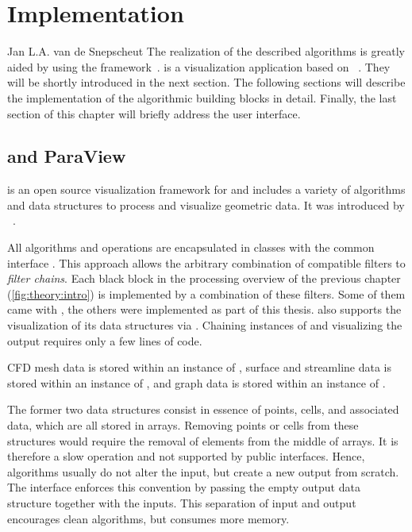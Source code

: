 

\chapter{Implementation}
\label{chp:impl}

{Jan L.A. van de Snepscheut}
%
The realization of the described algorithms is greatly aided by using the \vtk framework~\cite{VTK}. \paraview is a visualization application based on \vtk~\cite{ParaView}. They will be shortly introduced in the next section. The following sections will describe the implementation of the algorithmic building blocks in detail. Finally, the last section of this chapter will briefly address the user interface.


\section[VTK and ParaView]{ and ParaView}

\emph{\vtk}is an open source visualization framework for \Cpp and includes a variety of algorithms and data structures to process and visualize geometric data. It was introduced by ~\cite{VTKPaper}.

All \vtk algorithms and operations are encapsulated in classes with the common interface . This approach allows the arbitrary combination of compatible filters to \emph{filter chains}. Each black block in the processing overview of the previous chapter (\autoref{fig:theory:intro}) is implemented by a combination of these filters. Some of them came with \vtk, the others were implemented as part of this thesis.
\vtk also supports the visualization of its data structures via .
Chaining instances of  and visualizing the output requires only a few lines of code.

\threed \ac{CFD} mesh data is stored within an instance of , surface and streamline data is stored within an instance of , and graph data is stored within an instance of .

The former two data structures consist in essence of points, cells, and associated data, which are all stored in arrays. Removing points or cells from these structures would require the removal of elements from the middle of arrays. It is therefore a slow operation and not supported by public \vtk interfaces. Hence, \vtk algorithms usually do not alter the input, but create a new output from scratch. The  interface enforces this convention %
by passing the empty output data structure together with the inputs. This separation of input and output encourages clean algorithms, but consumes more memory.%
 

